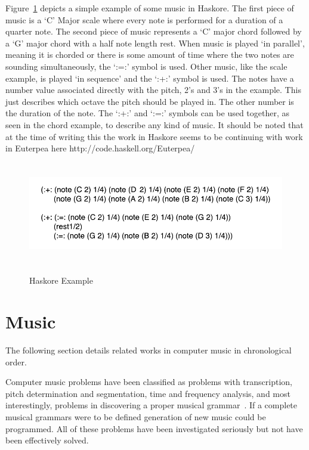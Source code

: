 \documentclass[12pt]{ucthesis}
\newcommand{\captionfonts}{\small\bf\ssp}
\begin{document}
Figure~\ref{fig:haskore-example} depicts a simple example of some music in Haskore. The first piece of music is a `C' Major scale where every note is performed for a duration of a quarter note. The second piece of music represents a `C' major chord followed by a `G' major chord with a half note length rest. When music is played `in parallel', meaning it is chorded or there is some amount of time where the two notes are sounding simultaneously, the `:=:' symbol is used. Other music, like the scale example, is played `in sequence' and the `:+:' symbol is used. The notes have a number value associated directly with the pitch, 2's and 3's in the example. This just describes which octave the pitch should be played in. The other number is the duration of the note. The `:+:' and `:=:' symbols can be used together, as seen in the chord example, to describe any kind of music. It should be noted that at the time of writing this the work in Haskore seems to be continuing with work in Euterpea here http://code.haskell.org/Euterpea/

\begin{figure}
\includegraphics[height=45mm]{haskore-example.pdf}
\captionfonts
\caption[Haskore Example]{Haskore Example}
\label{fig:haskore-example}
\end{figure}



\section{Music}
\label{rw:music}
The following section details related works in computer music in chronological order.

Computer music problems have been classified as problems with transcription, pitch determination and segmentation, time and frequency analysis, and most interestingly, problems in discovering a proper musical grammar~\cite{Gerhard}. If a complete musical grammars were to be defined generation of new music could be programmed. All of these problems have been investigated seriously but not have been effectively solved.
\end{document}
